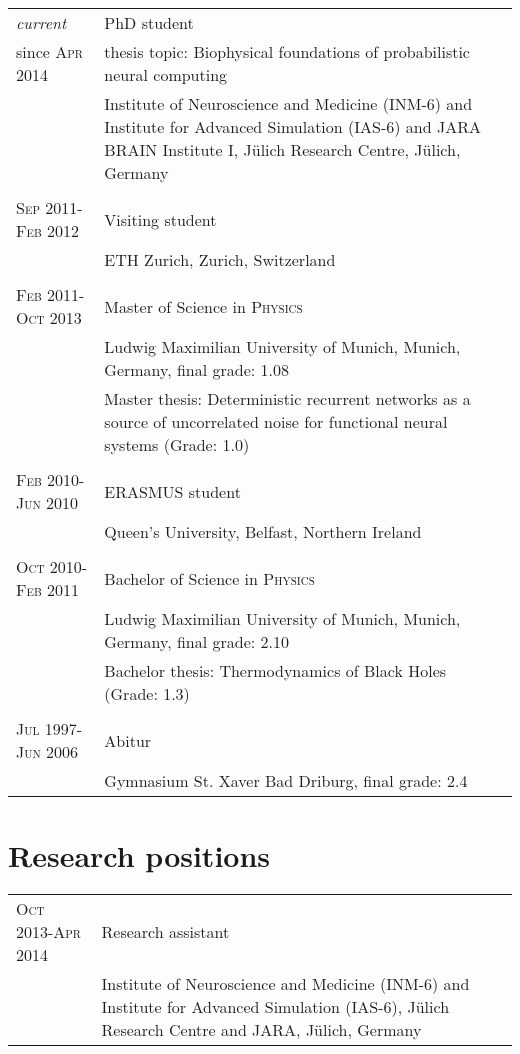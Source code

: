 \documentclass[a4paper,10pt]{article}
\begin{document}
\begin{tabular}{>{\hfill}p{3.15cm}|p{10.4cm}}
  \emph{current} & PhD student \\
  since \textsc{Apr 2014}& \footnotesize thesis topic: Biophysical foundations of probabilistic neural computing \\
  & \footnotesize Institute of Neuroscience and Medicine (INM-6) and Institute for Advanced Simulation (IAS-6) and JARA BRAIN Institute I, J\"ulich Research Centre, J\"ulich, Germany \\
  \multicolumn{2}{c}{} \\
  \textsc{Sep} 2011-\textsc{Feb} 2012 & Visiting student \\
  & \footnotesize{ETH Zurich, Zurich, Switzerland} \\
  \multicolumn{2}{c}{} \\
  \textsc{Feb} 2011-\textsc{Oct} 2013 & Master of Science in \textsc{Physics} \\
  & \footnotesize Ludwig Maximilian University of Munich, Munich, Germany, final grade: 1.08 \\
  & \footnotesize Master thesis: Deterministic recurrent networks as
  a source of uncorrelated noise for
  functional neural systems (Grade: 1.0) \\
  \multicolumn{2}{c}{} \\
  \textsc{Feb} 2010-\textsc{Jun} 2010 & ERASMUS student \\
  & \footnotesize Queen's University, Belfast, Northern Ireland \\
  \multicolumn{2}{c}{} \\
  \textsc{Oct} 2010-\textsc{Feb} 2011 & Bachelor of Science in \textsc{Physics} \\
  & \footnotesize Ludwig Maximilian University of Munich, Munich, Germany, final grade: 2.10 \\
  & \footnotesize Bachelor thesis: Thermodynamics of Black Holes (Grade: 1.3) \\
  \multicolumn{2}{c}{} \\
  \textsc{Jul} 1997-\textsc{Jun} 2006 & Abitur \\
  & \footnotesize Gymnasium St. Xaver Bad Driburg, final grade: 2.4
\end{tabular}

\section{Research positions}
\begin{tabular}{>{\hfill}p{3.15cm}|p{10.4cm}}
\textsc{Oct} 2013-\textsc{Apr} 2014 & Research assistant \\
& \footnotesize Institute of Neuroscience and Medicine (INM-6) and Institute for Advanced Simulation (IAS-6), J\"ulich Research Centre and JARA, J\"ulich, Germany\\
\end{tabular}
\end{document}
